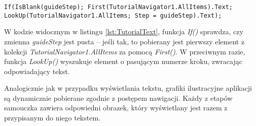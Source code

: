 \begin{lstlisting}[language=PowerFx]
If(IsBlank(guideStep); First(TutorialNavigator1.AllItems).Text; LookUp(TutorialNavigator1.AllItems; Step = guideStep).Text);
\end{lstlisting}

W kodzie widocznym w listingu \ref{lst:TutorialText}, funkcja \emph{If()} sprawdza, czy zmienna \emph{guideStep} jest pusta -- jeśli tak, to pobierany jest pierwszy element z kolekcji \emph{TutorialNavigator1.AllItems} za pomocą \emph{First()}. W przeciwnym razie, funkcja \emph{LookUp()} wyszukuje element o pasującym numerze kroku, zwracając odpowiadający tekst.

Analogicznie jak w przypadku wyświetlania tekstu, grafiki ilustracyjne aplikacji są dynamicznie pobierane zgodnie z postępem nawigacji. Każdy z etapów samouczka zawiera odpowiedni obrazek, który wyświetlany jest razem z przypisanym do niego tekstem.